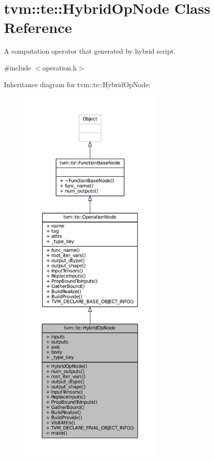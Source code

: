 \hypertarget{classtvm_1_1te_1_1HybridOpNode}{}\section{tvm\+:\+:te\+:\+:Hybrid\+Op\+Node Class Reference}
\label{classtvm_1_1te_1_1HybridOpNode}


A computation operator that generated by hybrid script.  




{\ttfamily \#include $<$operation.\+h$>$}



Inheritance diagram for tvm\+:\+:te\+:\+:Hybrid\+Op\+Node\+:
\nopagebreak
\begin{figure}[H]
\begin{center}
\leavevmode
\includegraphics[height=550pt]{classtvm_1_1te_1_1HybridOpNode__inherit__graph}
\end{center}
\end{figure}


